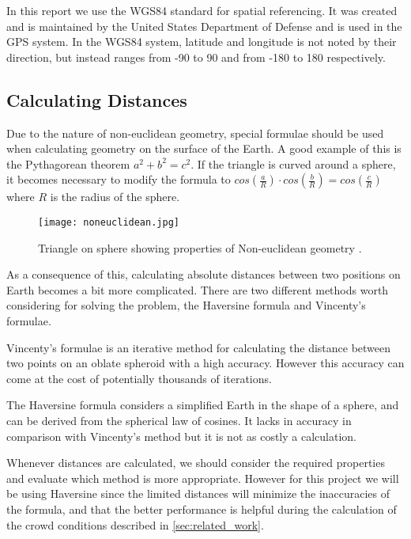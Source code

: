 In this report we use the WGS84 standard for spatial referencing. It was created and is maintained by the United States Department of Defense \cite{WGS84} and is used in the GPS system. In the WGS84 system, latitude and longitude is not noted by their direction, but instead ranges from -90 to 90 and from -180 to 180 respectively.

\subsection{Calculating Distances}

Due to the nature of non-euclidean geometry, special formulae should be used when calculating geometry on the surface of the Earth. A good example of this is the Pythagorean theorem $a^2 + b^2 = c^2$. If the triangle is curved around a sphere, it becomes necessary to modify the formula to $cos(\frac{a}{R}) \cdot cos(\frac{b}{R}) = cos(\frac{c}{R})$ where $R$ is the radius of the sphere\cite{website:lawofcosines}.

\begin{figure}
    \centering
\texttt{[image: noneuclidean.jpg]}
\caption[Triangle on sphere]{Triangle on sphere showing properties of Non-euclidean geometry \cite{earthtriangle}.}
\label{noneuclidean}
\end{figure}

As a consequence of this, calculating absolute distances between two positions on Earth becomes a bit more complicated. There are two different methods worth considering for solving the problem, the Haversine formula and Vincenty's formulae.

Vincenty's formulae\cite{vincenty} is an iterative method for calculating the distance between two points on an oblate spheroid with a high accuracy. However this accuracy can come at the cost of potentially thousands of iterations.

The Haversine formula considers a simplified Earth in the shape of a sphere, and can be derived from the spherical law of cosines\cite{website:lawofcosines}. It lacks in accuracy in comparison with Vincenty's method but it is not as costly a calculation.

Whenever distances are calculated, we should consider the required properties and evaluate which method is more appropriate. However for this project we will be using Haversine since the limited distances will minimize the inaccuracies of the formula, and that the better performance is helpful during the calculation of the crowd conditions described in \cref{sec:related_work}.


